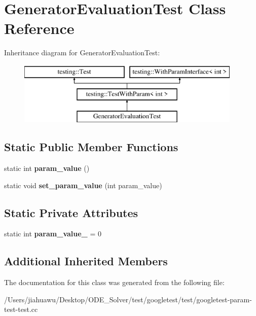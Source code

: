 \hypertarget{class_generator_evaluation_test}{}\section{Generator\+Evaluation\+Test Class Reference}
\label{class_generator_evaluation_test}
Inheritance diagram for Generator\+Evaluation\+Test\+:\begin{figure}[H]
\begin{center}
\leavevmode
\includegraphics[height=3.000000cm]{class_generator_evaluation_test}
\end{center}
\end{figure}
\subsection*{Static Public Member Functions}
\begin{DoxyCompactItemize}
\item 
\mbox{\label{class_generator_evaluation_test_ac819769e32b738677401424deb3c8cbe}} 
static int {\bfseries param\+\_\+value} ()
\item 
\mbox{\label{class_generator_evaluation_test_ae4f5fb96577dd680d9fa1fd6c3c4af46}} 
static void {\bfseries set\+\_\+param\+\_\+value} (int param\+\_\+value)
\end{DoxyCompactItemize}
\subsection*{Static Private Attributes}
\begin{DoxyCompactItemize}
\item 
\mbox{\label{class_generator_evaluation_test_a6bae9750692a4cc4799176eada25ef99}} 
static int {\bfseries param\+\_\+value\+\_\+} = 0
\end{DoxyCompactItemize}
\subsection*{Additional Inherited Members}


The documentation for this class was generated from the following file\+:\begin{DoxyCompactItemize}
\item 
/\+Users/jiahuawu/\+Desktop/\+O\+D\+E\+\_\+\+Solver/test/googletest/test/googletest-\/param-\/test-\/test.\+cc\end{DoxyCompactItemize}
